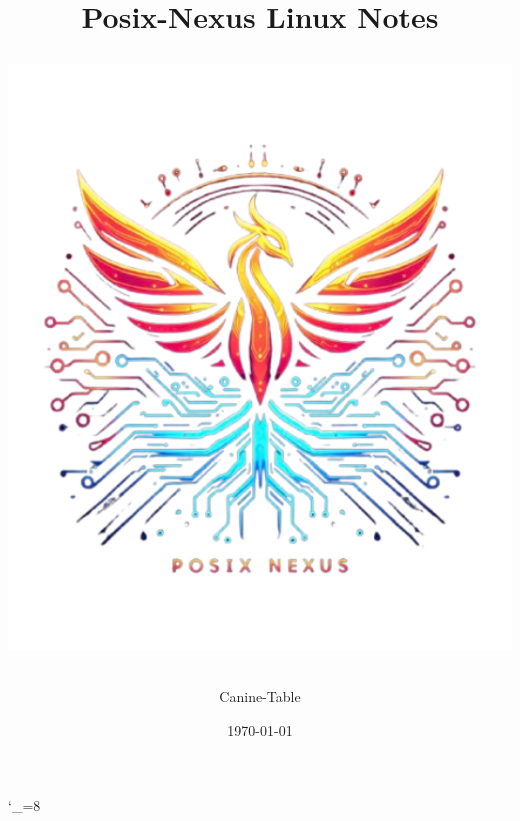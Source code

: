 \documentclass[a4paper,12pt]{article}
\begin{document}
\title{
		\hspace{48px}\textbf{Posix-Nexus Linux Notes}\\[10mm]
		\begin{NexMainBox}[dark, shpA,fit, width=\linewidth/2]
			\includegraphics[width=\textwidth]{img/posix-nexus.png}
		\end{NexMainBox}
	}
	\author{Canine-Table}
	\date{\today}
	\maketitle
	\newpage
	\begin{NexMainBox}[light, title=Contents, hdrB, breakable]
		\thispagestyle{plain}
		\tableofcontents
	\end{NexMainBox}
	\newpage
	\catcode`_=8
	
\end{document}
